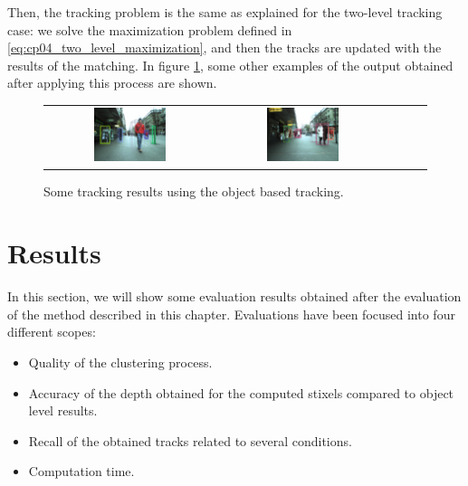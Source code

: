 Then, the tracking problem is the same as explained for the two-level tracking case: we solve the maximization problem defined in \ref{eq:cp04_two_level_maximization}, and then the tracks are updated with the results of the matching. In figure \ref{fig:cp04_tracking_examples_object}, some other examples of the output obtained after applying this process are shown.

\begin{figure}[h!]
    \centering
    \begin{tabular}{ccccc}
      \includegraphics[width=0.45\textwidth]{sequenceObstacle/obstacle15}\label{fig:cp04_object_level_example_30} &
      \includegraphics[width=0.45\textwidth]{sequenceObstacle/obstacle126}\label{fig:cp04_object_level_example_320}
    \end{tabular}
  \caption{Some tracking results using the object based tracking.}\label{fig:cp04_tracking_examples_object}
\end{figure}

\section{Results}\label{ch:chapter04_02}

In this section, we will show some evaluation results obtained after the evaluation of the method described in this chapter. Evaluations have been focused into four different scopes: 

\begin{itemize}
 \item Quality of the clustering process.
 \item Accuracy of the depth obtained for the computed stixels compared to object level results.
 \item Recall of the obtained tracks related to several conditions.
 \item Computation time.
\end{itemize}

